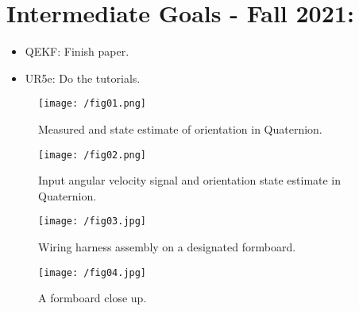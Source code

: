 \documentclass[11pt]{article}
\begin{document}
\section{Intermediate Goals - Fall 2021:}
\begin{itemize}
      \item QEKF: Finish paper.
      \item UR5e: Do the tutorials.
\end{itemize}


\begin{figure}[h]
      \centering
      \texttt{[image: /fig01.png]}
      \caption{Measured and state estimate of orientation in Quaternion.}
\end{figure}

\begin{figure}[h]
      \centering
      \texttt{[image: /fig02.png]}
      \caption{Input angular velocity signal and orientation state estimate in
      Quaternion.}
\end{figure}
\newpage

\begin{figure}[h]
      \centering
      \texttt{[image: /fig03.jpg]}
      \caption{Wiring harness assembly on a designated formboard.}
\end{figure}

\begin{figure}[h]
      \centering
      \texttt{[image: /fig04.jpg]}
      \caption{A formboard close up.}
\end{figure}
\newpage

\newpage


\end{document}
